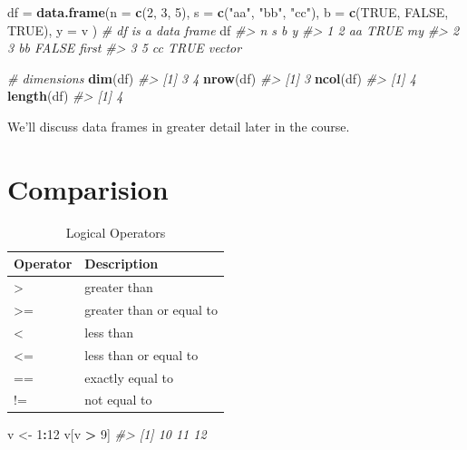 \documentclass[]{book}
\newenvironment{Shaded}{\begin{snugshade}}{\end{snugshade}}
\newcommand{\KeywordTok}[1]{\textcolor[rgb]{0.13,0.29,0.53}{\textbf{#1}}}
\newcommand{\DataTypeTok}[1]{\textcolor[rgb]{0.13,0.29,0.53}{#1}}
\newcommand{\DecValTok}[1]{\textcolor[rgb]{0.00,0.00,0.81}{#1}}
\newcommand{\StringTok}[1]{\textcolor[rgb]{0.31,0.60,0.02}{#1}}
\newcommand{\CommentTok}[1]{\textcolor[rgb]{0.56,0.35,0.01}{\textit{#1}}}
\newcommand{\OtherTok}[1]{\textcolor[rgb]{0.56,0.35,0.01}{#1}}
\newcommand{\OperatorTok}[1]{\textcolor[rgb]{0.81,0.36,0.00}{\textbf{#1}}}
\newcommand{\NormalTok}[1]{#1}
\begin{document}
\begin{Shaded}
\begin{Highlighting}[]
\NormalTok{df =}\StringTok{ }\KeywordTok{data.frame}\NormalTok{(}\DataTypeTok{n =} \KeywordTok{c}\NormalTok{(}\DecValTok{2}\NormalTok{, }\DecValTok{3}\NormalTok{, }\DecValTok{5}\NormalTok{),}
                \DataTypeTok{s =} \KeywordTok{c}\NormalTok{(}\StringTok{"aa"}\NormalTok{, }\StringTok{"bb"}\NormalTok{, }\StringTok{"cc"}\NormalTok{),}
                \DataTypeTok{b =} \KeywordTok{c}\NormalTok{(}\OtherTok{TRUE}\NormalTok{, }\OtherTok{FALSE}\NormalTok{, }\OtherTok{TRUE}\NormalTok{),}
                \DataTypeTok{y =}\NormalTok{ v}
\NormalTok{                )       }\CommentTok{# df is a data frame }
\NormalTok{df}
\CommentTok{#>   n  s     b      y}
\CommentTok{#> 1 2 aa  TRUE     my}
\CommentTok{#> 2 3 bb FALSE  first}
\CommentTok{#> 3 5 cc  TRUE vector}

\CommentTok{# dimensions}
\KeywordTok{dim}\NormalTok{(df)}
\CommentTok{#> [1] 3 4}
\KeywordTok{nrow}\NormalTok{(df)}
\CommentTok{#> [1] 3}
\KeywordTok{ncol}\NormalTok{(df)}
\CommentTok{#> [1] 4}
\KeywordTok{length}\NormalTok{(df)}
\CommentTok{#> [1] 4}
\end{Highlighting}
\end{Shaded}

We'll discuss data frames in greater detail later in the course.

\section{Comparision}\label{comparision}

\begin{table}[t]

\caption{\label{tab:table-logicalOps}Logical Operators}
\centering
\begin{tabular}{ll}
\toprule
Operator & Description\\
\midrule
> & greater than\\
>= & greater than or equal to\\
< & less than\\
<= & less than or equal to\\
== & exactly equal to\\
\addlinespace
!= & not equal to\\
\bottomrule
\end{tabular}
\end{table}

\begin{Shaded}
\begin{Highlighting}[]
\NormalTok{v <-}\StringTok{ }\DecValTok{1}\OperatorTok{:}\DecValTok{12}
\NormalTok{v[v }\OperatorTok{>}\StringTok{ }\DecValTok{9}\NormalTok{]}
\CommentTok{#> [1] 10 11 12}
\end{Highlighting}
\end{Shaded}
\end{document}
